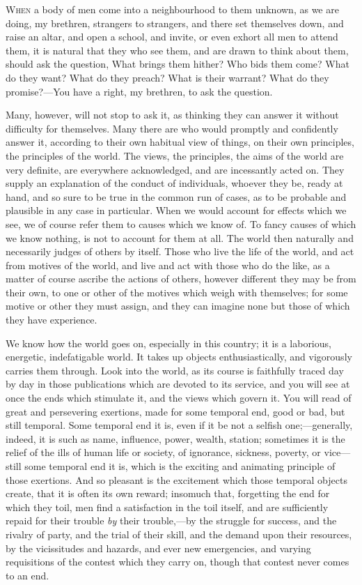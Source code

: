 
W\textsc{hen} a body of men come into a neighbourhood to them unknown, as we
are doing, my brethren, strangers to strangers, and there set
themselves down, and raise an altar, and open a school, and invite, or
even exhort all men to attend them, it is natural that they who see
them, and are drawn to think about them, should ask the question, What
brings them hither? Who bids them come? What do they want? What do
they preach? What is their warrant? What do they promise?—You have a
right, my brethren, to ask the question.

Many, however, will not stop to ask it, as thinking they can answer
it without difficulty for themselves. Many there are who would
promptly and confidently answer it, according to their own habitual
view of things, on their own principles, the principles of the world.
The views, the principles, the aims of the world are very definite,
are everywhere acknowledged, and are incessantly acted on. They supply
an explanation of the conduct of individuals, whoever they be, ready
at hand, and so sure to be true in the common run of cases, as to be
probable and plausible in any case in particular. When we would
account for effects which we see, we of course refer them to causes
which we know of. To fancy causes of which we know nothing, is not to
account for them at all. The world then naturally and necessarily
judges of others by itself. Those who live the life of the world, and
act from motives of the world, and live and act with those who do the
like, as a matter of course ascribe the actions of others, however
different they may be from their own, to one or other of the motives
which weigh with themselves; for some motive or other they must
assign, and they can imagine none but those of which they have
experience.

We know how the world goes on, especially in this country; it is a
laborious, energetic, indefatigable world. It takes up objects
enthusiastically, and vigorously carries them through. Look into the
world, as its course is faithfully traced day by day in those
publications which are devoted to its service, and you will see at
once the ends which stimulate it, and the views which govern it. You
will read of great and persevering exertions, made for some temporal
end, good or bad, but still temporal. Some temporal end it is, even if
it be not a selfish one;—generally, indeed, it is such as name,
influence, power, wealth, station; sometimes it is the relief of the
ills of human life or society, of ignorance, sickness, poverty, or
vice—still some temporal end it is, which is the exciting and
animating principle of those exertions. And so pleasant is the
excitement which those temporal objects create, that it is often its
own reward; insomuch that, forgetting the end for which they toil, men
find a satisfaction in the toil itself, and are sufficiently repaid
for their trouble \emph{by} their trouble,—by the struggle for
success, and the rivalry of party, and the trial of their skill, and
the demand upon their resources, by the vicissitudes and hazards, and
ever new emergencies, and varying requisitions of the contest which
they carry on, though that contest never comes to an end.

